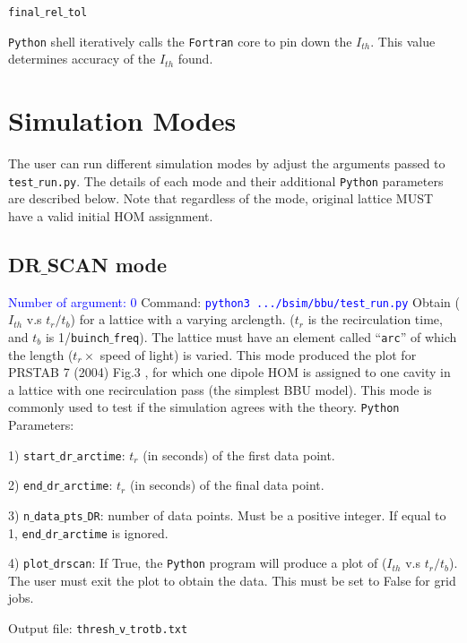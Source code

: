 \documentclass{article}
\begin{document}
\bigbreak
\hspace*{-2cm}
\texttt{final$\_$rel$\_$tol}

\noindent
\texttt{Python} shell iteratively calls the  \texttt{Fortran} core to pin down the $I_{th}$. This value determines accuracy of the $I_{th}$ found.



\section{Simulation Modes}
The user can run different simulation modes by adjust the arguments passed to  \texttt{test$\_$run.py}. The details of each mode and their additional \texttt{Python} parameters are described below. Note that regardless of the mode, original lattice MUST have a valid initial HOM assignment. 


\subsection{DR$\_$SCAN mode}
\textcolor{blue}{Number of argument: 0}
\bigbreak
Command: \textcolor{blue}{\texttt{python3   .../bsim/bbu/test$\_$run.py}} 
\bigbreak
Obtain ($I_{th}$ v.s $t_r/t_b$) for a lattice with a varying arclength. ($t_r$ is the recirculation time, and $t_b$ is 1/\texttt{buinch$\_$freq}). The lattice must have an element called ``\texttt{arc}'' of which the length ($t_r \times$ speed of light) is varied.
This mode produced the plot for PRSTAB 7 (2004) Fig.3 \cite{Georg_BBU}, for which one dipole HOM is assigned to one cavity in a lattice with one recirculation pass (the simplest BBU model).
This mode is commonly used to test if the simulation agrees with the theory.
\bigbreak
\texttt{Python} Parameters:

1) \texttt{start$\_$dr$\_$arctime}: $t_r$ (in seconds) of the first data point.

2) \texttt{end$\_$dr$\_$arctime}: $t_r$ (in seconds) of the final data point.

3) \texttt{n$\_$data$\_$pts$\_$DR}: number of data points. Must be a positive integer. If equal to 1, \texttt{end$\_$dr$\_$arctime} is ignored.

4) \texttt{plot$\_$drscan}: If True, the \texttt{Python} program will produce a plot of ($I_{th}$ v.s $t_r/t_b$). The user must exit the plot to obtain the data. This must be set to False for grid jobs.  

\bigbreak
Output file: \texttt{thresh$\_$v$\_$trotb.txt}
\end{document}
